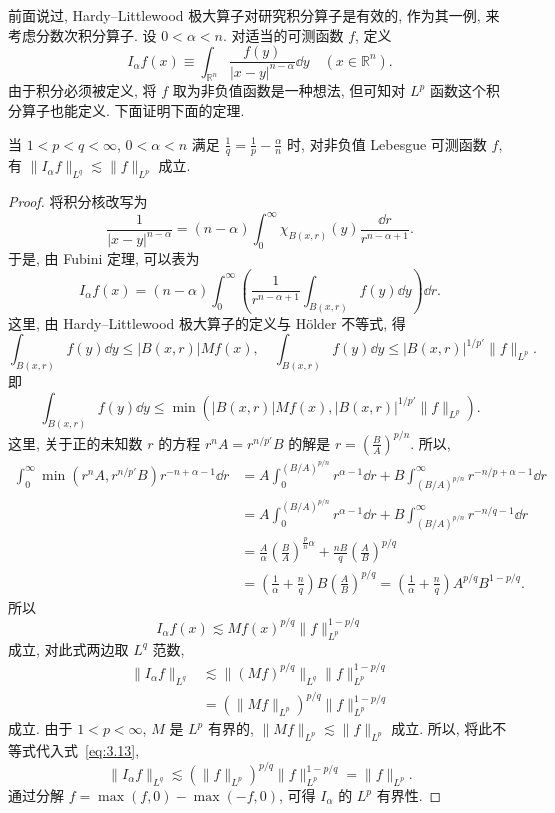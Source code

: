 前面说过, Hardy--Littlewood 极大算子对研究积分算子是有效的, 作为其一例, 来考虑分数次积分算子. 设 $0 < \alpha < n$. 对适当的可测函数 $f$, 定义
\begin{equation}\tag{3.12}
I_{\alpha}f(x) \equiv \int_{\mathbb{R}^{n}}\frac{f(y)}{|x-y|^{n-\alpha}}\dd y \quad (x \in \mathbb{R}^{n}).
\label{eq:3.12}
\end{equation}
由于积分必须被定义, 将 $f$ 取为非负值函数是一种想法, 但可知对 $L^{p}$ 函数这个积分算子也能定义. 下面证明下面的定理.

\begin{theorem}\label{thm:3.5}
当 $1 < p < q < \infty$, $0 < \alpha < n$ 满足 $\frac{1}{q} = \frac{1}{p} - \frac{\alpha}{n}$ 时, 对非负值 Lebesgue 可测函数 $f$, 有 $\|I_{\alpha}f\|_{L^{q}} \lesssim \|f\|_{L^{p}}$ 成立.
\end{theorem}

\begin{proof}
将积分核改写为
\[
\frac{1}{|x-y|^{n-\alpha}} = (n-\alpha)\int_{0}^{\infty}\chi_{B(x,r)}(y)\frac{\dd r}{r^{n-\alpha+1}}.
\]
于是, 由 Fubini 定理, 可以表为
\[
I_{\alpha}f(x) = (n-\alpha)\int_{0}^{\infty}\left(\frac{1}{r^{n-\alpha+1}}\int_{B(x,r)}f(y)\dd y\right)\dd r.
\]
这里, 由 Hardy--Littlewood 极大算子的定义与 Hölder 不等式, 得
\[
\int_{B(x,r)}f(y)\dd y \leq |B(x,r)|Mf(x), \quad \int_{B(x,r)}f(y)\dd y \leq |B(x,r)|^{1/p'}\|f\|_{L^{p}}.
\]
即
\[
\int_{B(x,r)}f(y)\dd y \leq \min(|B(x,r)|Mf(x), |B(x,r)|^{1/p'}\|f\|_{L^{p}}).
\]
这里, 关于正的未知数 $r$ 的方程 $r^{n}A = r^{n/p'}B$ 的解是 $r = \left(\frac{B}{A}\right)^{p/n}$. 所以,
\begin{align*}
\int_{0}^{\infty}\min(r^{n}A, r^{n/p'}B)r^{-n+\alpha-1}\dd r
&= A\int_{0}^{(B/A)^{p/n}}r^{\alpha-1}\dd r + B\int_{(B/A)^{p/n}}^{\infty}r^{-n/p+\alpha-1}\dd r \\
&= A\int_{0}^{(B/A)^{p/n}}r^{\alpha-1}\dd r + B\int_{(B/A)^{p/n}}^{\infty}r^{-n/q-1}\dd r \\
&= \frac{A}{\alpha}\left(\frac{B}{A}\right)^{\frac{p}{n}\alpha} + \frac{nB}{q}\left(\frac{A}{B}\right)^{p/q} \\
&= \left(\frac{1}{\alpha} + \frac{n}{q}\right)B\left(\frac{A}{B}\right)^{p/q} = \left(\frac{1}{\alpha} + \frac{n}{q}\right)A^{p/q}B^{1-p/q}.
\end{align*}
所以
\[
I_{\alpha}f(x) \lesssim Mf(x)^{p/q}\|f\|_{L^{p}}^{1-p/q}
\]
成立, 对此式两边取 $L^{q}$ 范数,
\begin{equation}
\begin{aligned}
\|I_{\alpha}f\|_{L^{q}} &\lesssim \|(Mf)^{p/q}\|_{L^{q}}\|f\|_{L^{p}}^{1-p/q} \\
&= (\|Mf\|_{L^{p}})^{p/q}\|f\|_{L^{p}}^{1-p/q}
\end{aligned}\tag{3.13}
\label{eq:3.13}
\end{equation}
成立. 由于 $1 < p < \infty$, $M$ 是 $L^{p}$ 有界的, $\|Mf\|_{L^{p}} \lesssim \|f\|_{L^{p}}$ 成立. 所以, 将此不等式代入式~\eqref{eq:3.13},
\[
\|I_{\alpha}f\|_{L^{q}} \lesssim (\|f\|_{L^{p}})^{p/q}\|f\|_{L^{p}}^{1-p/q} = \|f\|_{L^{p}}.
\]
通过分解 $f = \max(f, 0) - \max(-f, 0)$, 可得 $I_{\alpha}$ 的 $L^{p}$ 有界性.
\end{proof}

